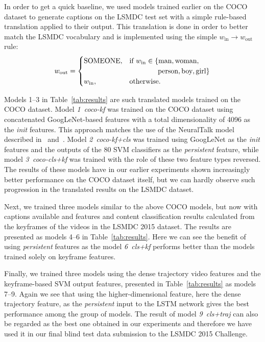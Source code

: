 \newcommand{\model}[1]{\emph{#1}}

In order to get a quick baseline, we used models trained earlier on the COCO
dataset to generate captions on the LSMDC test set with a simple rule-based
translation applied to their output.  This translation is done in order to
better match the LSMDC vocabulary and is implemented using the simple
$w_{\text{in}} \longrightarrow w_{\text{out}}$ rule:
\begin{align} \label{eqTrans} w_{\text{out}} = \begin{cases} \text{SOMEONE},&
\text{if } w_{\text{in}} \in \{\text{man}, \text{woman}, \\&
\text{\mbox{\qquad\qquad person}}, \text{boy}, \text{girl} \}\\ w_{\text{in}},&
\text{otherwise.} \end{cases} \end{align}

Models 1--3 in Table~\ref{tab:results} are such translated models trained on the
COCO dataset.
Model \model{1~coco-kf} was trained on the COCO dataset using concatenated
GoogLeNet-based features with a total dimensionality of 4096 as the \emph{init}
features. 
This approach matches the use of the NeuralTalk model described
in~\cite{Vinyals_2015_CVPR} and~\cite{Karpathy_2015_CVPR}. 
Model \model{2~coco-kf+cls} was trained using GoogLeNet as the \emph{init}
features and the outputs of the 80 SVM classifiers as the \emph{persistent}
feature, while model \model{3~coco-cls+kf} was trained with the role of these
two feature types reversed.
The results of these models have in our earlier experiments shown increasingly
better performance on the COCO dataset itself, but we can hardly observe such
progression in the translated results on the LSMDC dataset.

Next, we trained three models similar to the above COCO models, but now with
captions available and features and content classification results calculated
from the keyframes of the videos in the LSMDC 2015 dataset.
The results are presented as models 4--6 in Table~\ref{tab:results}. 
Here we can see the benefit of using \emph{persistent} features as the model
\model{6~cls+kf} performs better than the models trained solely on keyframe
features.

Finally, we trained three models using the dense trajectory video features and
the keyframe-based SVM output features, presented in Table~\ref{tab:results} as
models 7--9.
Again we see that using the higher-dimensional feature, here the dense
trajectory feature, as the \emph{persistent} input to the LSTM network gives the
best performance among the group of models.
The result of model \model{9~cls+traj} can also be regarded as the best one
obtained in our experiments and therefore we have used it in our final blind
test data submission to the LSMDC 2015 Challenge.


